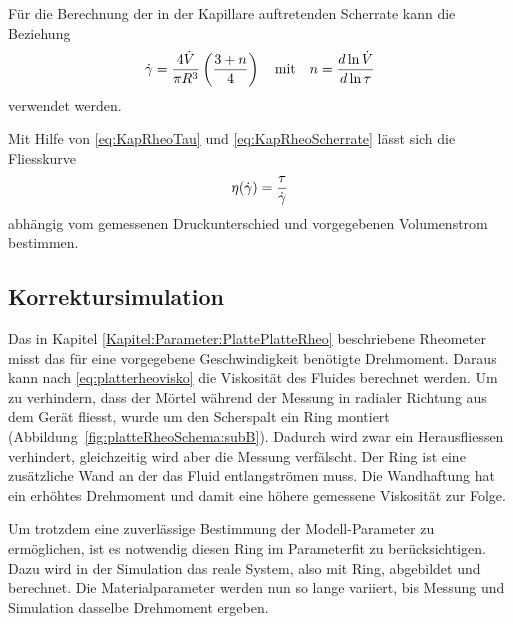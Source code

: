 Für die Berechnung der in der Kapillare auftretenden Scherrate kann die Beziehung
\begin{equation}
    \label{eq:KapRheoScherrate}
    \dot\gamma = \frac{4 \dot{V}}{\pi R^3}\left( \frac{3+n}{4} \right)\quad\mbox{mit}\quad n=\frac{d \ln \dot{V}}{d\ln\tau}
\end{equation}
verwendet werden. 

Mit Hilfe von \eqref{eq:KapRheoTau} und \eqref{eq:KapRheoScherrate} lässt sich die Fliesskurve 
\begin{equation}
    \eta(\dot\gamma) = \frac{\tau}{\dot\gamma}
\end{equation}
abhängig vom gemessenen Druckunterschied und vorgegebenen Volumenstrom bestimmen.
%
%
\subsection{Korrektursimulation}
\label{Kapitel:Korrektursimulation}
Das in Kapitel \ref{Kapitel:Parameter:PlattePlatteRheo} beschriebene Rheometer misst das für eine vorgegebene Geschwindigkeit benötigte Drehmoment. Daraus kann nach \eqref{eq:platterheovisko} die Vis\-ko\-si\-tät des Fluides berechnet werden.
Um zu verhindern, dass der Mörtel während der Messung in radialer Richtung aus dem Gerät fliesst, wurde um den Scherspalt ein Ring montiert (Abbildung~\ref{fig:platteRheoSchema:subB}). Dadurch wird zwar ein Herausfliessen verhindert, gleichzeitig wird aber die Messung verfälscht. Der Ring ist eine zusätzliche Wand an der das Fluid entlangströmen muss. Die Wandhaftung hat ein erhöhtes Drehmoment und damit eine höhere gemessene Viskosität zur Folge.

Um trotzdem eine zuverlässige Bestimmung der Modell-Parameter zu ermöglichen, ist es notwendig diesen Ring im Parameterfit zu berücksichtigen. 
Dazu wird in der Simulation das reale System, also mit Ring, abgebildet und berechnet. Die Materialparameter werden nun so lange variiert, bis Messung und Simulation dasselbe Drehmoment ergeben.

